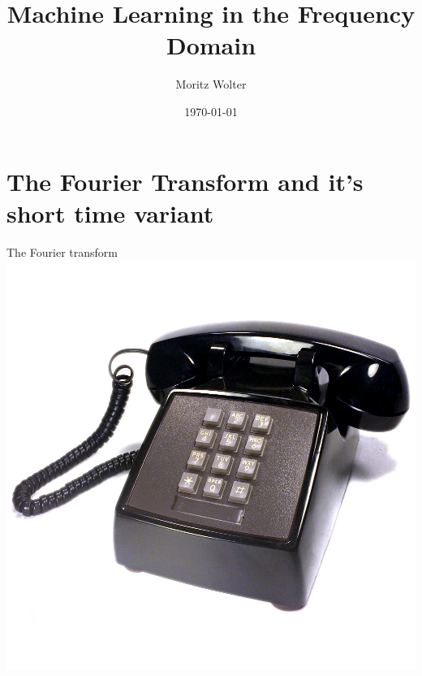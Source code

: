 \documentclass[xcolor=dvipsnames]{beamer}
\title[Machine Learning in the Frequency Domain]{Machine Learning in the Frequency Domain} %
\author{Moritz Wolter} %
\institute[Universit\"at Bonn] %
{
\medskip
\textit{wolter@cs.uni-bonn.de} %
}
\date{\today} %
\begin{document}
\begin{frame}
\titlepage %
\end{frame}


\section{The Fourier Transform and it's short time variant}

\begin{frame}{The Fourier transform}
\centering
\includegraphics[width=0.6\linewidth]{img/phone_wiki.jpg}
\end{frame}
\end{document}
